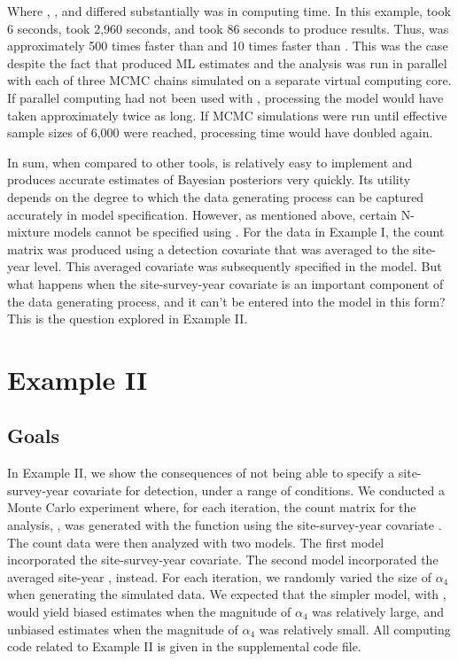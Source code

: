 \documentclass[codesnippet]{jss}
\begin{document}
Where , , and  differed 
substantially was in computing time. In this example,  took 6 
seconds,  took 2,960 seconds, and  took 86 
seconds to produce results. Thus,  was approximately 500 times 
faster than  and 10 times faster than . This 
was the case despite the fact that  produced ML estimates and 
the  analysis was run in parallel with each of three MCMC 
chains simulated on a separate virtual computing core. If parallel computing 
had not been used with , processing the  model 
would have taken approximately twice as long. If MCMC simulations were run 
until effective sample sizes of 6,000 were reached, processing time would 
have doubled again.

In sum, when compared to other tools,  is relatively easy to 
implement and produces accurate estimates of Bayesian posteriors very 
quickly. Its utility depends on the degree to which the data generating 
process can be captured accurately in model specification. However, as 
mentioned above, certain N-mixture models cannot be specified using 
. For the data in Example I, the count matrix was produced using 
a detection covariate that was averaged to the site-year level. This 
averaged covariate was subsequently specified in the model. But what happens 
when the site-survey-year covariate is an important component of the data 
generating process, and it can't be entered into the model in this form? 
This is the question explored in Example II.

\section[Example II]{Example II}
\subsection[Goals]{Goals}
In Example II, we show the consequences of not being able to specify a site-survey-year covariate for detection, under a range of conditions. We conducted a Monte Carlo experiment where, for each iteration, the count matrix for the analysis, , was generated with the  function using the site-survey-year covariate . The count data were then analyzed with two  models. The first model incorporated the site-survey-year  covariate. The second model incorporated the averaged site-year , instead. For each iteration, we randomly varied the size of $\alpha_4$ when generating the simulated data. We expected that the simpler model, with , would yield biased estimates when the magnitude of $\alpha_4$ was relatively large, and unbiased estimates when the magnitude of $\alpha_4$ was relatively small. All computing code related to Example II is given in the supplemental code file.
\end{document}
